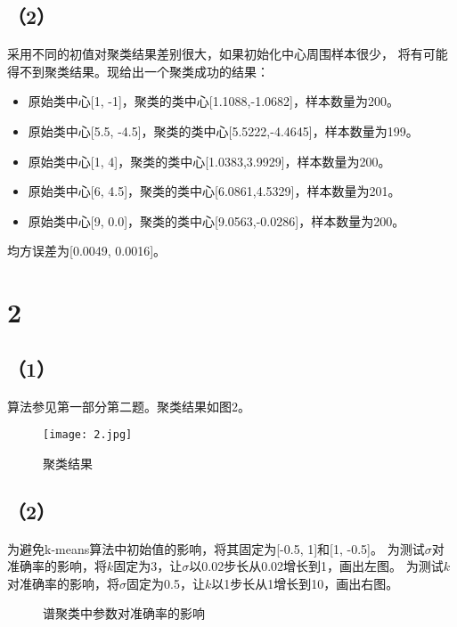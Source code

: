 \documentclass{article}
\begin{document}
\subsection*{（2）}
采用不同的初值对聚类结果差别很大，如果初始化中心周围样本很少，
将有可能得不到聚类结果。现给出一个聚类成功的结果：
\begin{itemize}
	\item 原始类中心[1, -1]，聚类的类中心[1.1088,-1.0682]，样本数量为200。
	\item 原始类中心[5.5, -4.5]，聚类的类中心[5.5222,-4.4645]，样本数量为199。
	\item 原始类中心[1, 4]，聚类的类中心[1.0383,3.9929]，样本数量为200。
	\item 原始类中心[6, 4.5]，聚类的类中心[6.0861,4.5329]，样本数量为201。
	\item 原始类中心[9, 0.0]，聚类的类中心[9.0563,-0.0286]，样本数量为200。
\end{itemize}

均方误差为[0.0049, 0.0016]。

\section*{2}
\subsection*{（1）}
算法参见第一部分第二题。聚类结果如图2。
\begin{figure}[ht]
	\centering
	\texttt{[image: 2.jpg]}
	\caption{聚类结果}
	\label{figl}
\end{figure}

\subsection*{（2）}
为避免k-means算法中初始值的影响，将其固定为[-0.5, 1]和[1, -0.5]。
为测试$\sigma$对准确率的影响，将$k$固定为3，让$\sigma$以0.02步长从0.02增长到1，画出左图。
为测试$k$对准确率的影响，将$\sigma$固定为0.5，让$k$以1步长从1增长到10，画出右图。
\begin{figure}[ht]
	\centering
	\centering
	\caption{谱聚类中参数对准确率的影响}
	\label{figl}
\end{figure}
\end{document}
